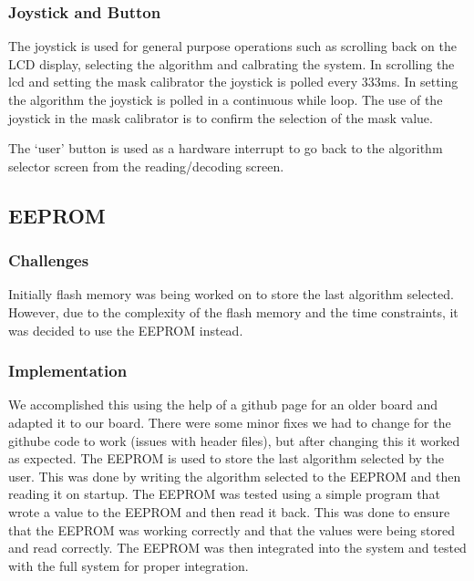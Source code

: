 \documentclass{cce2014-design}
\begin{document}
{{	  \subsubsection{Joystick and Button}
	  The joystick is used for general purpose operations such as
	  scrolling back on the LCD display, selecting the algorithm and
	  calbrating the system. In scrolling the lcd and setting the mask
	  calibrator the joystick is polled
	  every 333ms. In setting the algorithm
	  the joystick is polled in a continuous while loop.
	  The use of the joystick in the mask calibrator is to confirm the
	  selection of the mask value.

	  The `user' button is used as a hardware interrupt to go back to the
	  algorithm selector screen from the reading/decoding screen.
  }
  \subsection{EEPROM}
  {
	  \subsubsection{Challenges}
	  Initially flash memory was being worked on to store the last
	  algorithm
	  selected. However, due to the complexity
	  of the flash memory and the time constraints, it was decided to use
	  the
	  EEPROM instead.
	  \subsubsection{Implementation}
	  We accomplished this using the help of a github page
	  \cite{githubEEPROM}
	  for an older board and adapted it to our board. There were some minor
	  fixes we had to change for the
	  githube code to work (issues with header files), but after changing
	  this it worked as expected.
	  The EEPROM is used to store the last algorithm selected by the user.
	  This was done by writing
	  the algorithm selected to the EEPROM
	  and then reading it on startup. The EEPROM was tested using a simple
	  program that wrote a value to the EEPROM
	  and then read it back. This was done to ensure that the EEPROM was
	  working correctly and that the values were
	  being stored and read correctly. The EEPROM was then integrated into
	  the system and tested with the full system for proper integration.
  }
 }
\end{document}
